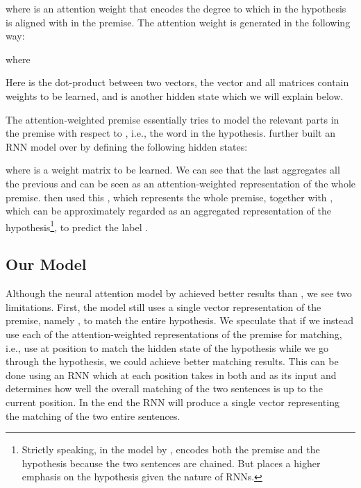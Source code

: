 \documentclass[11pt,letterpaper]{article}
\begin{document}
\small

\normalsize
where  is an attention weight that encodes the degree to which  in the hypothesis is aligned with  in the premise.
The attention weight  is generated in the following way:

\small

\normalsize
where 

\small

\normalsize
Here  is the dot-product between two vectors, the vector  and all matrices  contain weights to be learned, and  is another hidden state which we will explain below.

The attention-weighted premise  essentially tries to model the relevant parts in the premise with respect to , i.e., the  word in the hypothesis.
 further built an RNN model over  by defining the following hidden states:

\small

\normalsize
where  is a weight matrix to be learned.
We can see that the last  aggregates all the previous  and can be seen as an attention-weighted representation of the whole premise.
 then used this , which represents the whole premise, together with , which can be approximately regarded as an aggregated representation of the hypothesis\footnote{Strictly speaking, in the model by ,  encodes both the premise and the hypothesis because the two sentences are chained. But  places a higher emphasis on the hypothesis given the nature of RNNs.},
to predict the label .

\subsection{Our Model}

Although the neural attention model by  achieved better results than , we see two limitations.
First, the model still uses a single vector representation of the premise, namely , to match the entire hypothesis.
We speculate that if we instead use each of the attention-weighted representations of the premise for matching, i.e., use  at position  to match the hidden state  of the hypothesis while we go through the hypothesis, we could achieve better matching results.
This can be done using an RNN which at each position takes in both  and  as its input and determines how well the overall matching of the two sentences is up to the current position.
In the end the RNN will produce a single vector representing the matching of the two entire sentences.
\end{document}
